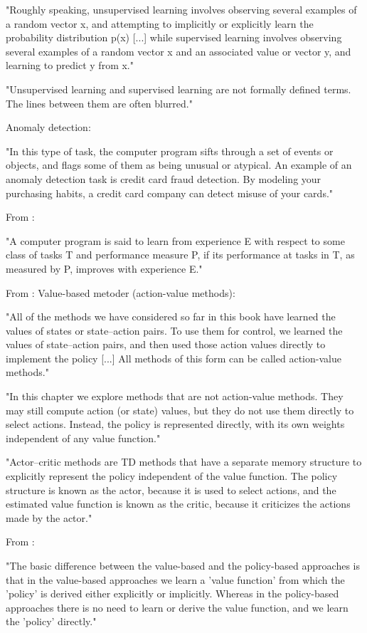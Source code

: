 "Roughly speaking, unsupervised learning involves observing several examples of a random vector x, and attempting to implicitly or explicitly learn the probability distribution p(x) [...] while supervised learning involves observing several examples of a random vector x and an associated value or vector y, and learning to predict y from x."

"Unsupervised learning and supervised learning are not formally defined terms. The lines between them are often blurred."

Anomaly detection: 

"In this type of task, the computer program sifts through a set of events or objects, and flags some of them as being unusual or atypical. An example of an anomaly detection task is credit card fraud detection. By modeling your purchasing habits, a credit card company can detect misuse of your cards."

From \parencite{mitchell1997machine_learning} :

"A computer program is said to learn from experience E with respect to some class of tasks T and performance measure P, if its performance at tasks in T, as measured by P, improves with experience E."

From \parencite{sutton2018reinforcement_learning} :
Value-based metoder (action-value methods):

"All of the methods we have considered so far in this book have learned the values of states or state–action pairs. To use them for control, we learned the values of state–action pairs, and then used those action values directly to implement the policy [...] All methods of this form can be called action-value methods."

"In this chapter we explore methods that are not action-value methods. They may still compute action (or state) values, but they do not use them directly to select actions. Instead, the policy is represented directly, with its own weights independent of any value function."

"Actor–critic methods are TD methods that have a separate memory structure to explicitly represent the policy independent of the value function. The policy structure is known as the actor, because it is used to select actions, and the estimated value function is known as the critic, because it criticizes the actions made by the actor."

From \parencite{sewak2019policy_based_reinforcement_learning_approaches} :

"The basic difference between the value-based and the policy-based approaches is that in the value-based approaches we learn a 'value function' from which the 'policy' is derived either explicitly or implicitly. Whereas in the policy-based approaches there is no need to learn or derive the value function, and we learn the 'policy' directly."

